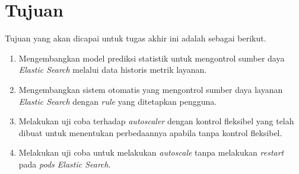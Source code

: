 \section{Tujuan}

Tujuan yang akan dicapai untuk tugas akhir ini adalah sebagai berikut.

\begin{enumerate}
    \item Mengembangkan model prediksi statistik untuk mengontrol sumber daya \textit{Elastic Search} melalui data historis metrik layanan.
    \item Mengembangkan sistem otomatis yang mengontrol sumber daya layanan \textit{Elastic Search} dengan \textit{rule} yang ditetapkan pengguna.
    \item Melakukan uji coba terhadap \textit{autoscaler} dengan kontrol fleksibel yang telah dibuat untuk menentukan perbedaannya apabila tanpa kontrol fleksibel.
    \item Melakukan uji coba untuk melakukan \textit{autoscale} tanpa melakukan \textit{restart} pada \textit{pods Elastic Search}.
\end{enumerate}